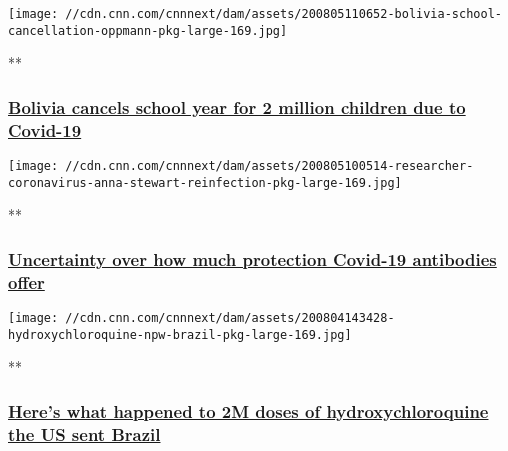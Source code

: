 \href{/videos/world/2020/08/05/bolivia-schools-closed-coronavirus-covid-19-pandemic-cases-latin-america-oppmann-pkg-intl-ldn-vpx.cnn/video/playlists/coronavirus-intl/}{}

\texttt{[image: //cdn.cnn.com/cnnnext/dam/assets/200805110652-bolivia-school-cancellation-oppmann-pkg-large-169.jpg]}

**

\hypertarget{bolivia-cancels-school-year-for-2-million-children-due-to-covid-19}{%
\subsubsection{\texorpdfstring{\href{/videos/world/2020/08/05/bolivia-schools-closed-coronavirus-covid-19-pandemic-cases-latin-america-oppmann-pkg-intl-ldn-vpx.cnn/video/playlists/coronavirus-intl/}{Bolivia
cancels school year for 2 million children due to
Covid-19}}{Bolivia cancels school year for 2 million children due to Covid-19}}\label{bolivia-cancels-school-year-for-2-million-children-due-to-covid-19}}

\href{/videos/world/2020/08/05/coronavirus-covid-19-pandemic-testing-antibodies-stewart-pkg-nr-intl-lnd-vpx.cnn/video/playlists/coronavirus-intl/}{}

\texttt{[image: //cdn.cnn.com/cnnnext/dam/assets/200805100514-researcher-coronavirus-anna-stewart-reinfection-pkg-large-169.jpg]}

**

\hypertarget{uncertainty-over-how-much-protection-covid-19-antibodies-offer}{%
\subsubsection{\texorpdfstring{\href{/videos/world/2020/08/05/coronavirus-covid-19-pandemic-testing-antibodies-stewart-pkg-nr-intl-lnd-vpx.cnn/video/playlists/coronavirus-intl/}{Uncertainty
over how much protection Covid-19 antibodies
offer}}{Uncertainty over how much protection Covid-19 antibodies offer}}\label{uncertainty-over-how-much-protection-covid-19-antibodies-offer}}

\href{/videos/world/2020/08/04/brazil-coronavirus-covid-19-pandemic-jair-bolsonaro-donald-trump-hydroxychloroquine-npw-intl-ldn-vpx.cnn/video/playlists/coronavirus-intl/}{}

\texttt{[image: //cdn.cnn.com/cnnnext/dam/assets/200804143428-hydroxychloroquine-npw-brazil-pkg-large-169.jpg]}

**

\hypertarget{heres-what-happened-to-2m-doses-of-hydroxychloroquine-the-us-sent-brazil}{%
\subsubsection{\texorpdfstring{\href{/videos/world/2020/08/04/brazil-coronavirus-covid-19-pandemic-jair-bolsonaro-donald-trump-hydroxychloroquine-npw-intl-ldn-vpx.cnn/video/playlists/coronavirus-intl/}{Here's
what happened to 2M doses of hydroxychloroquine the US sent
Brazil}}{Here's what happened to 2M doses of hydroxychloroquine the US sent Brazil}}\label{heres-what-happened-to-2m-doses-of-hydroxychloroquine-the-us-sent-brazil}}

